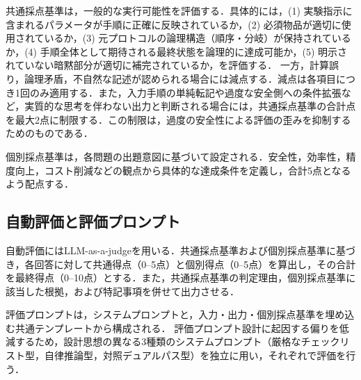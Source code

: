 \documentclass[twocolumn]{jarticle}
\begin{document}
共通採点基準は，一般的な実行可能性を評価する．具体的には，(1) 実験指示に含まれるパラメータが手順に正確に反映されているか，(2) 必須物品が適切に使用されているか，(3) 元プロトコルの論理構造（順序・分岐）が保持されているか，(4) 手順全体として期待される最終状態を論理的に達成可能か，(5) 明示されていない暗黙部分が適切に補完されているか，を評価する．
一方，計算誤り，論理矛盾，不自然な記述が認められる場合には減点する．減点は各項目につき1回のみ適用する．また，入力手順の単純転記や過度な安全側への条件拡張など，実質的な思考を伴わない出力と判断される場合には，共通採点基準の合計点を最大2点に制限する．この制限は，過度の安全性による評価の歪みを抑制するためのものである．

個別採点基準は，各問題の出題意図に基づいて設定される．安全性，効率性，精度向上，コスト削減などの観点から具体的な達成条件を定義し，合計5点となるよう配点する．

\subsection{自動評価と評価プロンプト}\label{sec:judge_design}
自動評価にはLLM-as-a-judgeを用いる．共通採点基準および個別採点基準に基づき，各回答に対して共通得点（0--5点）と個別得点（0--5点）を算出し，その合計を最終得点（0--10点）とする．また，共通採点基準の判定理由，個別採点基準に該当した根拠，および特記事項を併せて出力させる．

評価プロンプトは，システムプロンプトと，入力・出力・個別採点基準を埋め込む共通テンプレートから構成される．
評価プロンプト設計に起因する偏りを低減するため，設計思想の異なる3種類のシステムプロンプト（厳格なチェックリスト型，自律推論型，対照デュアルパス型）を独立に用い，それぞれで評価を行う．
\end{document}

